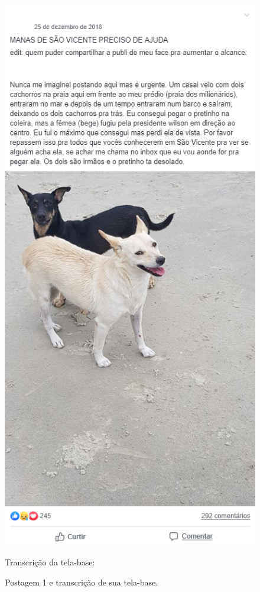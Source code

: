 \documentclass{textolivre-html}
\begin{document}
\begin{figure}[htbp]
 \begin{minipage}{.45\textwidth}
 \centering
 \includegraphics[width=\textwidth]{fig03.png}
 \caption{Postagem 1 e transcrição de sua tela-base.}
 \label{fig03}
 \end{minipage}\hfill
 \begin{minipage}{0.5\textwidth}
 Transcrição da tela-base:\\
 

\end{minipage}
\end{figure}
\end{document}
